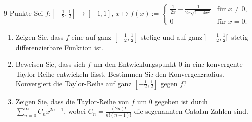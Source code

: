 \documentclass{problemset}
\author{Michael van Straten}
\begin{document}
\maketitle

\begin{problem}{9 Punkte}
Sei $f : \left[-\frac{1}{2}, \frac{1}{2}\right] \to [-1, 1]$, $x \mapsto f(x) := \begin{cases} \frac{1}{2x} - \frac{1}{2x\sqrt{1 - 4x^2}} & \text{für } x \neq 0, \\ 0 & \text{für } x = 0. \end{cases}$
\begin{enumerate}
    \item Zeigen Sie, dass $f$ eine auf ganz $\left[-\frac{1}{2},
          \frac{1}{2}\right]$ stetige und auf ganz $]\,-\frac{1}{2},
          \frac{1}{2}[\,$ stetig differenzierbare Funktion ist.
    \item Beweisen Sie, dass sich $f$ um den Entwicklungspunkt 0 in eine
          konvergente Taylor-Reihe entwickeln lässt. Bestimmen Sie den
          Konvergenzradius. Konvergiert die Taylor-Reihe auf ganz
          $\left[-\frac{1}{2}, \frac{1}{2}\right]$ gegen $f$?
    \item Zeigen Sie, dass die Taylor-Reihe von $f$ um 0 gegeben ist durch
          $\sum_{n=0}^{\infty} C_n x^{2n+1}$, wobei $C_n =
          \frac{(2n)!}{n!(n+1)!}$ die sogenannten Catalan-Zahlen sind.
\end{enumerate}
\end{problem}
\end{document}
